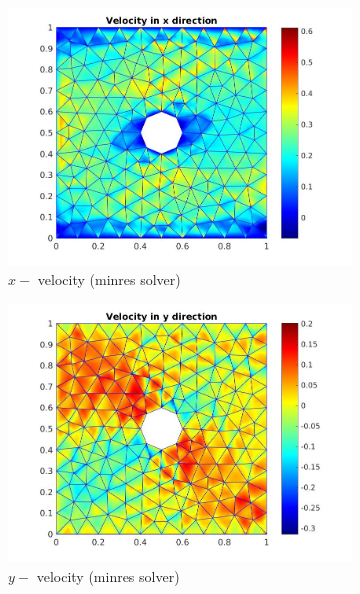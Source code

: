 \documentclass[a4paper]{book}
\begin{document}
\begin{figure}[H]
\begin{subfigure}{0.5\textwidth}	
  \includegraphics[width=\linewidth]{cylinder_minres_vx.jpg}
  \caption{$x-$ velocity (minres solver)}
  \label{x_vel_stoke_minres}
\end{subfigure}
\begin{subfigure}{0.5\textwidth}	
  \includegraphics[width=\linewidth]{cylinder_minres_vy.jpg}
  \caption{$y-$ velocity (minres solver)}
  \label{y_vel_stoke_minres}
\end{subfigure}
\begin{subfigure}{\textwidth}	

\end{subfigure}
\end{figure}
\end{document}
